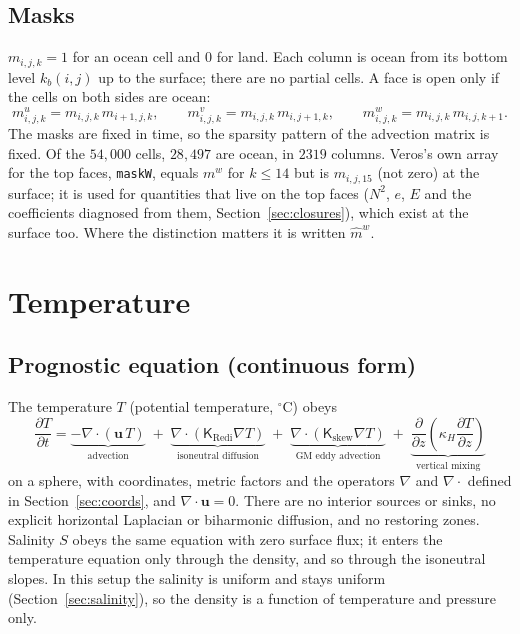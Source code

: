 \documentclass{article}
\begin{document}
\subsection{Masks}\label{sec:masks}
$m_{i,j,k} = 1$ for an ocean cell and $0$ for land.
Each column is ocean from its bottom level $k_b(i,j)$ up to the surface; there are no partial cells.
A face is open only if the cells on both sides are ocean:
\[
m^u_{i,j,k} = m_{i,j,k}\, m_{i+1,j,k}, \qquad
m^v_{i,j,k} = m_{i,j,k}\, m_{i,j+1,k}, \qquad
m^w_{i,j,k} = m_{i,j,k}\, m_{i,j,k+1}.
\]
The masks are fixed in time, so the sparsity pattern of the advection matrix is fixed.
Of the $54{,}000$ cells, $28{,}497$ are ocean, in $2319$ columns.
Veros's own array for the top faces, \texttt{maskW}, equals $m^w$ for $k \le 14$ but is $m_{i,j,15}$ (not zero) at the surface; it is used for quantities that live on the top faces ($N^2$, $e$, $E$ and the coefficients diagnosed from them, Section~\ref{sec:closures}), which exist at the surface too. Where the distinction matters it is written $\hat m^w$.

\section{Temperature}\label{sec:temperature}

\subsection{Prognostic equation (continuous form)}\label{sec:prognostic}

The temperature $T$ (potential temperature, $^\circ$C) obeys
\begin{equation}
\frac{\partial T}{\partial t}
= \underbrace{-\nabla \cdot \left( \mathbf{u}\, T \right)}_{\text{advection}}
\; + \; \underbrace{\nabla \cdot \left( \mathsf{K}_\text{Redi} \nabla T \right)}_{\text{isoneutral diffusion}}
\; + \; \underbrace{\nabla \cdot \left( \mathsf{K}_\text{skew} \nabla T \right)}_{\text{GM eddy advection}}
\; + \; \underbrace{\frac{\partial}{\partial z} \left( \kappa_H \frac{\partial T}{\partial z} \right)}_{\text{vertical mixing}}
\label{eq:T}
\end{equation}
on a sphere, with coordinates, metric factors and the operators $\nabla$ and $\nabla\cdot$ defined in Section~\ref{sec:coords}, and $\nabla\cdot\mathbf{u} = 0$.
There are no interior sources or sinks, no explicit horizontal Laplacian or biharmonic diffusion, and no restoring zones.
Salinity $S$ obeys the same equation with zero surface flux; it enters the temperature equation only through the density, and so through the isoneutral slopes.
In this setup the salinity is uniform and stays uniform (Section~\ref{sec:salinity}), so the density is a function of temperature and pressure only.
\end{document}

